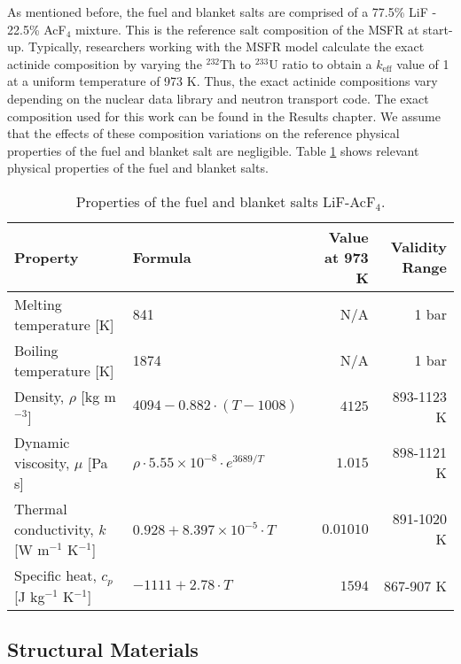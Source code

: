As mentioned before, the fuel and blanket salts are comprised of a 77.5\% LiF
- 22.5\% AcF$_4$ mixture. This is the reference salt composition of the
\gls{MSFR} at start-up. Typically, researchers working with the \gls{MSFR}
model calculate the exact actinide composition by varying the $^{232}$Th to
$^{233}$U ratio to obtain a $k_{\text{eff}}$ value of 1 at a uniform
temperature of 973 K. Thus, the exact actinide compositions vary depending on
the nuclear data library and neutron transport code. The exact composition
used for this work can be found in the Results chapter. We assume that the
effects of these composition variations on the reference physical properties
of the fuel and blanket salt are negligible. Table \ref{table:prip} shows
relevant physical properties of the fuel and blanket salts.
%
\begin{table}[htb!]
\small
\centering
\caption{Properties of the fuel and blanket salts LiF-AcF$_4$.}
\begin{tabular}{l l r r}
\toprule
Property & Formula & {Value at 973 K} & Validity Range\\
\midrule
Melting temperature [K] & 841 & {N/A} & 1 bar \\
Boiling temperature [K] & 1874 & {N/A} & 1 bar \\
Density, $\rho$ [kg m$^{-3}$] & $4094-0.882 \cdot (T-1008)$ & $4125$ & 893-1123 K \\
Dynamic viscosity, $\mu$ [Pa s] & $\rho \cdot 5.55 \times 10^{-8} \cdot e^{3689/T}$ & $1.015$ & 898-1121 K \\
Thermal conductivity, $k$ [W m$^{-1}$ K$^{-1}$] & $0.928+8.397 \times 10^{-5} \cdot T$ & $0.01010$ & 891-1020 K \\
Specific heat, $c_p$ [J kg$^{-1}$ K$^{-1}$] & $-1111+2.78\cdot T$ & $1594$ & 867-907 K \\
\bottomrule
\end{tabular}
\label{table:prip}
\end{table}

\subsection{Structural Materials}

